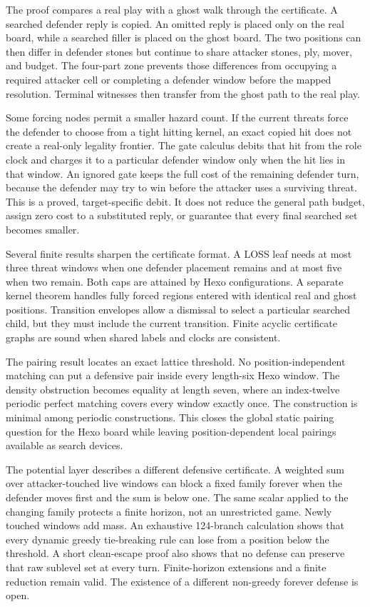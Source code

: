 The proof compares a real play with a ghost walk through the certificate.  A
searched defender reply is copied.  An omitted reply is placed only on the
real board, while a searched filler is placed on the ghost board.  The two
positions can then differ in defender stones but continue to share attacker
stones, ply, mover, and budget.  The four-part zone prevents those differences
from occupying a required attacker cell or completing a defender window
before the mapped resolution.  Terminal witnesses then transfer from the
ghost path to the real play.

Some forcing nodes permit a smaller hazard count.  If the current threats
force the defender to choose from a tight hitting kernel, an exact copied hit
does not create a real-only legality frontier.  The gate calculus debits that
hit from the role clock and charges it to a particular defender window only
when the hit lies in that window.  An ignored gate keeps the full cost of the
remaining defender turn, because the defender may try to win before the
attacker uses a surviving threat.  This is a proved, target-specific debit.
It does not reduce the general path budget, assign zero cost to a substituted
reply, or guarantee that every final searched set becomes smaller.

Several finite results sharpen the certificate format.  A LOSS leaf needs at
most three threat windows when one defender placement remains and at most five
when two remain.  Both caps are attained by Hexo configurations.  A separate
kernel theorem handles fully forced regions entered with identical real and
ghost positions.  Transition envelopes allow a dismissal to select a
particular searched child, but they must include the current transition.
Finite acyclic certificate graphs are sound when shared labels and clocks are
consistent.

The pairing result locates an exact lattice threshold.  No position-independent
matching can put a defensive pair inside every length-six Hexo window.  The
density obstruction becomes equality at length seven, where an index-twelve
periodic perfect matching covers every window exactly once.  The construction
is minimal among periodic constructions.  This closes the global static
pairing question for the Hexo board while leaving position-dependent local
pairings available as search devices.

The potential layer describes a different defensive certificate.  A weighted
sum over attacker-touched live windows can block a fixed family forever when
the defender moves first and the sum is below one.  The same scalar applied to
the changing family protects a finite horizon, not an unrestricted game.
Newly touched windows add mass.  An exhaustive 124-branch calculation shows
that every dynamic greedy tie-breaking rule can lose from a position below
the threshold.  A short clean-escape proof also shows that no defense can
preserve that raw sublevel set at every turn.  Finite-horizon extensions and a
finite reduction remain valid.  The existence of a different non-greedy
forever defense is open.

